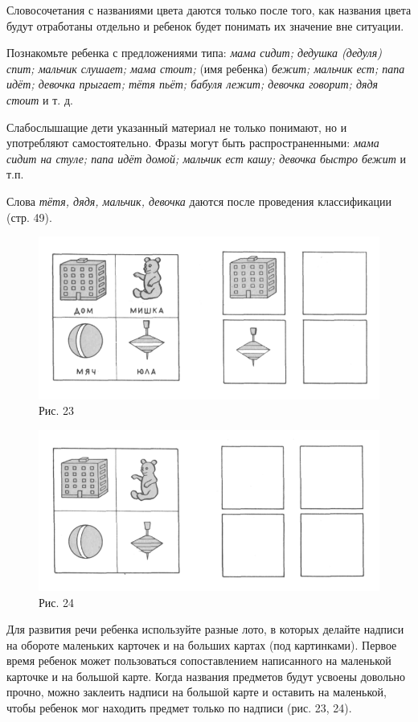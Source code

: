 \documentclass[a5paper]{book}
\renewcommand{\emph}[1]{\textit{#1}}
\begin{document}
Словосочетания с названиями цвета даются только после того, как названия
цвета будут отработаны отдельно и ребенок будет понимать их значение вне
ситуации.

Познакомьте ребенка с предложениями типа: \emph{мама сидит; дедушка
(дедуля) спит; мальчик слушает; мама стоит;} (имя ребенка) \emph{бежит;
мальчик ест; папа идёт; девочка прыгает; тётя пьёт; бабуля лежит;
девочка говорит; дядя стоит} и т. д.

Слабослышащие дети указанный материал не только понимают, но и
употребляют самостоятельно. Фразы могут быть распространенными:
\emph{мама сидит на стуле; папа идёт домой; мальчик ест кашу; девочка
быстро бежит} и т.п.

Слова \emph{тётя, дядя, мальчик, девочка} даются после проведения
классификации (стр. 49).

\begin{figure}
\centering
\includegraphics[width=\linewidth]{media/media/image20.png}
\caption*{Рис. 23}
\end{figure}

\begin{figure}
\centering
\includegraphics[width=\linewidth]{media/media/image21.png}
\caption*{Рис. 24}
\end{figure}

Для развития речи ребенка используйте разные лото, в которых делайте
надписи на обороте маленьких карточек и на больших картах (под
картинками). Первое время ребенок может пользоваться сопоставлением
написанного на маленькой карточке и на большой карте. Когда названия
предметов будут усвоены довольно прочно, можно заклеить надписи на
большой карте и оставить на маленькой, чтобы ребенок мог находить
предмет только по надписи (рис. 23, 24).
\end{document}
